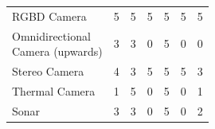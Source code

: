 \documentclass{article}
\begin{document}
\begin{table}[H]
\begin{adjustwidth}{-1.5in}{-1.5in}
\begin{tabular}{lcccccc}
		\multicolumn{1}{l}{\cellcolor{badhighlight!70}RGBD Camera }& \multicolumn{1}{c}{\cellcolor{badhighlight!70}5} & \multicolumn{1}{c}{\cellcolor{badhighlight!70}5 } & \multicolumn{1}{c}{\cellcolor{badhighlight!70}5 } & \multicolumn{1}{c}{\cellcolor{badhighlight!70}5 }   & \multicolumn{1}{c}{\cellcolor{badhighlight!70}5 } & \multicolumn{1}{c}{\cellcolor{badhighlight!70}5 } \\ \hdashline
		\makecell[l]{Omnidirectional \\ Camera (upwards)}            & 3                         & 3                          & 0                       & 5                              & 0                        & 0                    \\ \hdashline
		Stereo Camera                                                & 4                         & 3                          & 5                       & 5                              & 5                        & 3                    \\ \hdashline
		Thermal Camera                                               & 1                         & 5                          & 0                       & 5                              & 0                        & 1                    \\ \hdashline
		Sonar                                                        & 3                         & 3                          & 0                       & 5                              & 0                        & 2                   \\ 		
		\end{tabular}

		\end{adjustwidth}
		\end{table}
		
\end{document}
